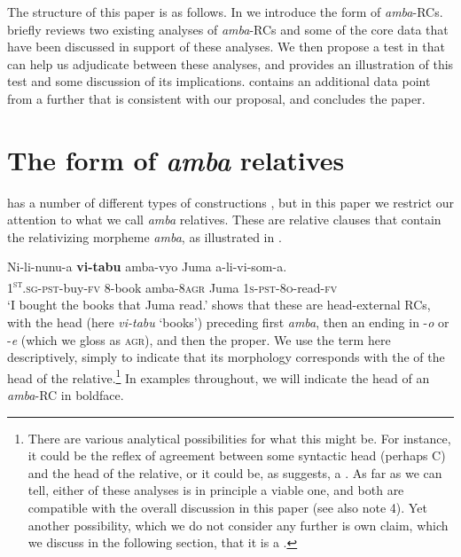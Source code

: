 \documentclass[output=paper,modfonts,nonflat,hidelinks]{langsci/langscibook}
\begin{document}
The structure of this paper is as follows. In  we introduce the form of \textit{amba}{}-RCs.  briefly reviews two existing analyses of \textit{amba}{}-RCs and some of the core data that have been discussed in support of these analyses. We then propose a test in  that can help us adjudicate between these analyses, and  provides an illustration of this test and some discussion of its implications.  contains an additional data point from a further  that is consistent with our proposal, and  concludes the paper. 

\section{The form of \textit{amba} relatives}\label{sec:gould:2}
 
 has a number of different types of  constructions \citep[cf.][]{Ngonyani2001}, but in this paper we restrict our attention to what we call \textit{amba} relatives. These are relative clauses that contain the relativizing morpheme \textit{amba}, as illustrated in . 
 
\ea
\gll Ni-li-nunu-a \textbf{vi-tabu} amba-vyo Juma a-li-vi-som-a.\\
\textsc{1\textsuperscript{st}}\textsc{.sg-pst}{}-buy-\textsc{fv} 8-book amba{}-8\textsc{agr} Juma \textsc{1s-pst-8o}{}-read-\textsc{fv}\\
\glt ‘I bought the books that Juma read.’  \label{ex:gould:1} 
\z
{} shows that these are head-external RCs, with the head (here \textit{vi-tabu} ‘books’) preceding first \textit{amba}, then an  ending in -\textit{o} or -\textit{e} (which we gloss as \textsc{agr}), and then the  proper.   We use the term  here descriptively, simply to indicate that its morphology corresponds  with the  of the head of the relative.\footnote{There are various analytical possibilities for what this  might be. For instance, it could be the reflex of agreement between some syntactic head (perhaps C) and the head of the relative, or it could be, as \citet{Henderson2006} suggests, a . As far as we can tell, either of these analyses is in principle a viable one, and both are compatible with the overall discussion in this paper (see also note 4). Yet another possibility, which we do not consider any further is  own claim, which we discuss in the following section, that it is a .} In examples throughout, we will indicate the head of an \textit{amba}{}-RC in boldface.
\end{document}
